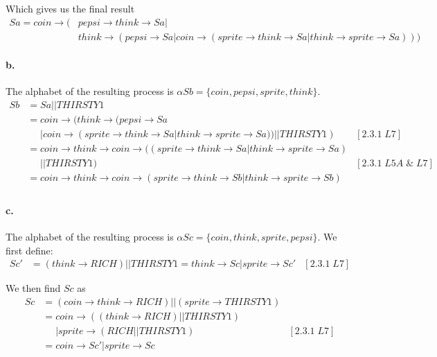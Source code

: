 \documentclass[a4paper, 11pt]{article}
\begin{document}
Which gives us the final result
\begin{align*}
Sa = coin \rightarrow (&pepsi \rightarrow think \rightarrow Sa | \\
    &think \rightarrow (pepsi \rightarrow Sa | coin \rightarrow (sprite \rightarrow think \rightarrow Sa | think \rightarrow sprite \rightarrow Sa)))
\end{align*}


\paragraph{b.} %
\label{par:b_}

The alphabet of the resulting process is $\alpha Sb = \{coin, pepsi, sprite, think\}$.
\begin{align*}
Sb &= Sa || THIRSTY1 \\
    &= coin \rightarrow (think \rightarrow (pepsi \rightarrow Sa \\
    &\phantom{=} | coin \rightarrow (sprite \rightarrow think \rightarrow Sa | think \rightarrow sprite \rightarrow Sa)) || THIRSTY1) & [2.3.1\;L7] \\
    &= coin \rightarrow think \rightarrow coin \rightarrow ((sprite \rightarrow think \rightarrow Sa | think \rightarrow sprite \rightarrow Sa) \\
    &\phantom{=} || THIRSTY1) & [2.3.1\;L5A\;\&\;L7] \\
    &= coin \rightarrow think \rightarrow coin \rightarrow (sprite \rightarrow think \rightarrow Sb | think \rightarrow sprite \rightarrow Sb) \\
\end{align*}


\paragraph{c.} %
\label{par:c_}

The alphabet of the resulting process is $\alpha Sc = \{coin, think, sprite, pepsi\}$. We first define:
\begin{align*}
Sc' &= (think \rightarrow RICH) || THIRSTY1 = think \rightarrow Sc | sprite \rightarrow Sc' & [2.3.1\;L7]
\end{align*}

We then find $Sc$ as
\begin{align*}
Sc &= (coin \rightarrow think \rightarrow RICH) || (sprite \rightarrow THIRSTY1) \\
   &= coin \rightarrow ((think \rightarrow RICH) || THIRSTY1) \\
   &\phantom{=} | sprite \rightarrow (RICH || THIRSTY1) & [2.3.1\;L7] \\
   &= coin \rightarrow Sc' | sprite \rightarrow Sc 
\end{align*}
\end{document}
